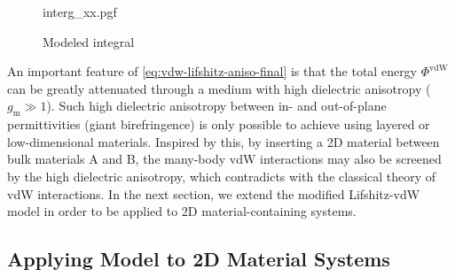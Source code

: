 \begin{figure}[h]
  \centering{}
  {interg_xx.pgf}
  \caption{\label{fig:vdw-integeral-x}%
    Modeled integral 
  }
\end{figure}

An important feature of \autoref{eq:vdw-lifshitz-aniso-final} is that
the total energy $\Phi^{\mathrm{vdW}}$ can be greatly attenuated
through a medium with high dielectric anisotropy (\ie
$g_{\mathrm{m}} \gg 1$).
%
Such high dielectric anisotropy between in- and out-of-plane
permittivities (giant birefringence) is only possible to achieve using
layered \cite{Collin_1958_aniso,Weber_2000_aniso} or low-dimensional
\cite{Niu_2018_aniso,Segura_2018_aniso} materials. Inspired by this,
by inserting a 2D material between bulk materials A and B, the
many-body  vdW interactions may also be
screened by the high dielectric anisotropy, which contradicts with the classical theory of vdW interactions. 
%
In the next section, we extend the modified Lifshitz-vdW model in
order to be applied to 2D material-containing systems.


\subsection{Applying Model to 2D Material Systems}
\label{sec:vdw-model-2D}

